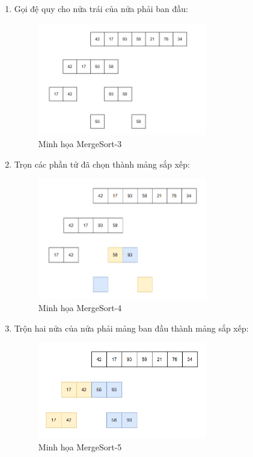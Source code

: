 \begin{enumerate}
    \item Gọi đệ quy cho nửa trái của nửa phải ban đầu:
    \begin{figure}[H]
        \centering
        \includegraphics[width=0.7\textwidth]{img/merge_sort/3.png}
        \caption{Minh họa MergeSort-3}
    \end{figure}
    
    \item Trọn các phần tử đã chọn thành mảng sắp xếp:
    \begin{figure}[H]
        \centering
        \includegraphics[width=0.7\textwidth]{img/merge_sort/4.png}
        \caption{Minh họa MergeSort-4}
    \end{figure}
    
    \item Trộn hai nửa của nửa phải mảng ban đầu thành mảng sắp xếp:
    \begin{figure}[H]
        \centering
        \includegraphics[width=0.7\textwidth]{img/merge_sort/5.png}
        \caption{Minh họa MergeSort-5}
    \end{figure}
    

\end{enumerate}
